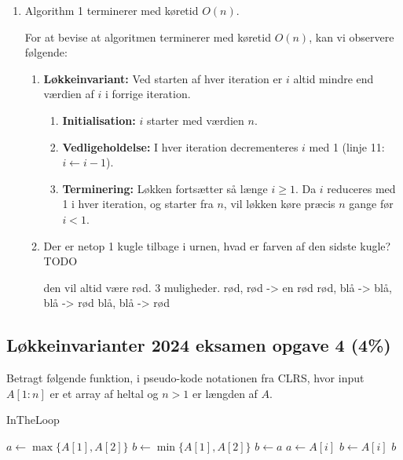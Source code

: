 \documentclass{article}
\theoremstyle{definition}
\begin{document}
\begin{enumerate}
    \item Algorithm 1 terminerer med køretid $O(n)$.
    
    For at bevise at algoritmen terminerer med køretid $O(n)$, kan vi observere følgende:

    \begin{enumerate}
    \item \textbf{Løkkeinvariant:} Ved starten af hver iteration er $i$ altid mindre end værdien af $i$ i forrige iteration.
    
        \begin{enumerate}
            \item \textbf{Initialisation:} $i$ starter med værdien $n$.
            
            \item \textbf{Vedligeholdelse:} I hver iteration decrementeres $i$ med 1 (linje 11: $i \leftarrow i-1$).
            
            \item \textbf{Terminering:} Løkken fortsætter så længe $i \geq 1$. Da $i$ reduceres med 1 i hver iteration, 
            og starter fra $n$, vil løkken køre præcis $n$ gange før $i < 1$.
        \end{enumerate}

    \item Der er netop 1 kugle tilbage i urnen, hvad er farven af den sidste kugle? TODO
    
    den vil altid være rød. 
    3 muligheder.
    rød, rød -> en rød
    rød, blå -> blå, blå -> rød
    blå, blå -> rød
\end{enumerate}

\end{enumerate}

\subsection{Løkkeinvarianter 2024 eksamen opgave 4 (4\%)}

Betragt følgende funktion, i pseudo-kode notationen fra CLRS, hvor input $A[1:n]$ er et array af heltal og $n > 1$ er længden af $A$.

\begin{algorithm}
\caption{InTheLoop}
\begin{algorithmic}[1]
\State $a \leftarrow \max\{A[1], A[2]\}$
\State $b \leftarrow \min\{A[1], A[2]\}$
        \State $b \leftarrow a$
        \State $a \leftarrow A[i]$
        \State $b \leftarrow A[i]$
    \EndIf
\EndFor
\State \Return $b$
\end{algorithmic}
\end{algorithm}
\end{document}

